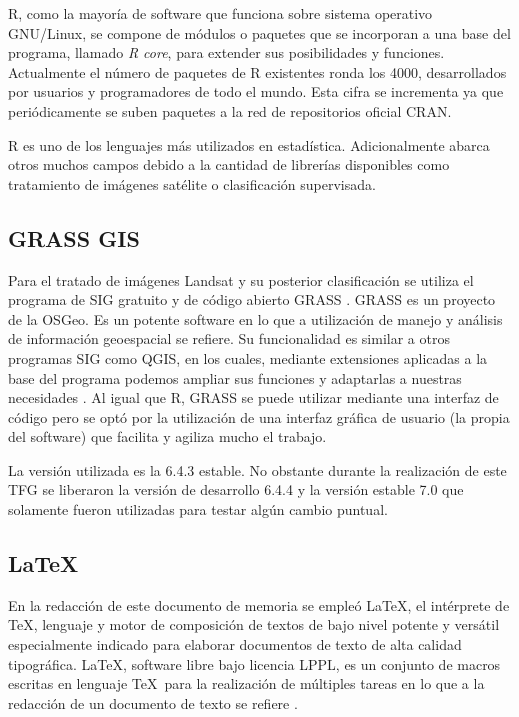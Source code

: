 R, como la mayoría de software que funciona sobre sistema operativo GNU/Linux, se compone de módulos o paquetes que se incorporan a una base del programa, llamado \textit{R core}, para extender sus posibilidades y funciones. Actualmente el número de paquetes de R existentes ronda los 4000, desarrollados por usuarios y programadores de todo el mundo. Esta cifra se incrementa ya que periódicamente se suben paquetes a la red de repositorios oficial \ac{CRAN}.\Sep

R es uno de los lenguajes más utilizados en estadística. Adicionalmente abarca otros muchos campos debido a la cantidad de librerías disponibles como tratamiento de imágenes satélite o clasificación supervisada.

\subsection{GRASS GIS}
Para el tratado de imágenes Landsat y su posterior clasificación se utiliza el programa de \ac{SIG} gratuito y de código abierto \ac{GRASS} \citep{GRASS_GIS_software}. GRASS es un proyecto de la \ac{OSGeo}. Es un potente software en lo que a utilización de manejo y análisis de información geoespacial se refiere. Su funcionalidad es similar a otros programas \ac{SIG} como QGIS, en los cuales, mediante extensiones aplicadas a la base del programa podemos ampliar sus funciones y adaptarlas a nuestras necesidades \citep{neteler2002open}. Al igual que R, \ac{GRASS} se puede utilizar mediante una interfaz de código pero se optó por la utilización de una interfaz gráfica de usuario (la propia del software) que facilita y agiliza mucho el trabajo.\Sep

La versión utilizada es la 6.4.3 estable. No obstante durante la realización de este \ac{TFG} se liberaron la versión de desarrollo 6.4.4 y la versión estable 7.0 que solamente fueron utilizadas para testar algún cambio puntual.

\subsection{\LaTeX}
En la redacción de este documento de memoria se empleó \LaTeX, el intérprete de \TeX, lenguaje y motor de composición de textos de bajo nivel potente y versátil especialmente indicado para elaborar documentos de texto de alta calidad tipográfica. \LaTeX, software libre bajo licencia LPPL, es un conjunto de macros escritas en lenguaje \TeX\ para la realización de múltiples tareas en lo que a la redacción de un documento de texto se refiere \citep{Latex2011} \citep{galindo2001} \citep{lamport1994}.\Sep

